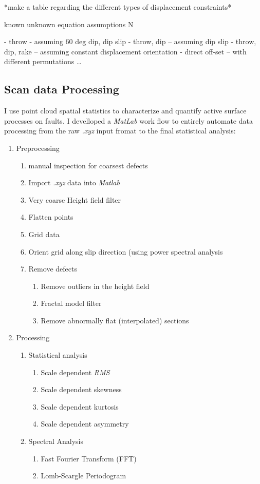 \documentclass[12pt,a4paper]{article}
\begin{document}
*make a table regarding the different types of displacement constraints*

known 		unknown 	equation 	assumptions		N

- throw - assuming 60 deg dip, dip slip 
- throw, dip – assuming dip slip 
- throw, dip, rake – assuming constant displacement orientation
- direct off-set – with different permutations …

	\subsection{Scan data Processing}

I use point cloud spatial statistics to characterize and quantify active surface processes on faults. I develloped a \textit{MatLab} work flow to entirely automate data processing from the raw \textit{.xyz} input fromat to the final statistical analysis:

\begin{enumerate}
	\item Preprocessing
	\begin{enumerate}
		\item manual inspection for coarsest defects
		\item Import \textit{.xyz} data into \textit{Matlab}
		\item Very coarse Height field filter
		\item Flatten points
		\item Grid data
		\item Orient grid along slip direction (using power spectral analysis 
		\item Remove defects
		\begin{enumerate}
			\item Remove outliers in the height field
			\item Fractal model filter
			\item Remove abnormally flat (interpolated) sections
		\end{enumerate}
	\end{enumerate}
	\item Processing
	\begin{enumerate}
		\item Statistical analysis
		\begin{enumerate}
			\item Scale dependent \textit{RMS}
			\item Scale dependent skewness
			\item Scale dependent kurtosis
			\item Scale dependent asymmetry
		\end{enumerate}
		\item Spectral Analysis
		\begin{enumerate}
			\item Fast Fourier Transform (FFT)
			\item Lomb-Scargle Periodogram
		\end{enumerate}
	\end{enumerate}
\end{enumerate}
  
\end{document}
